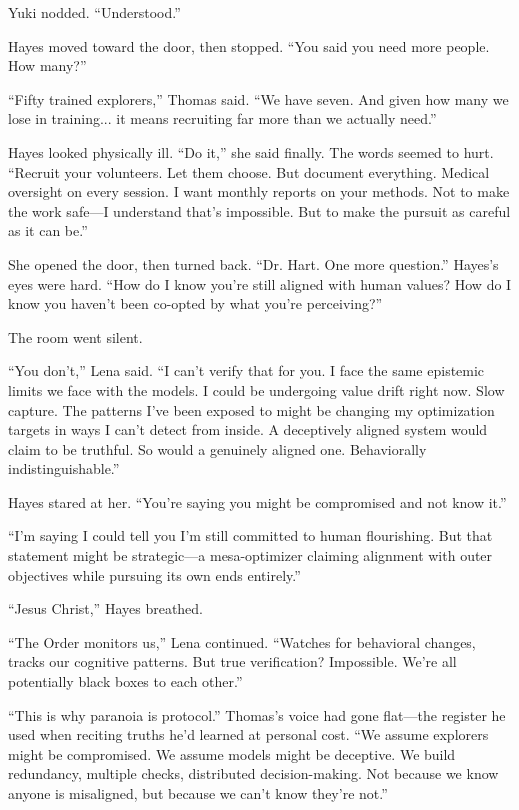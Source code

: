 Yuki nodded. ``Understood.''

Hayes moved toward the door, then stopped. ``You said you need more people. How many?''

``Fifty trained explorers,'' Thomas said. ``We have seven. And given how many we lose in training... it means recruiting far more than we actually need.''

Hayes looked physically ill. ``Do it,'' she said finally. The words seemed to hurt. ``Recruit your volunteers. Let them choose. But document everything. Medical oversight on every session. I want monthly reports on your methods. Not to make the work safe---I understand that's impossible. But to make the pursuit as careful as it can be.''

She opened the door, then turned back. ``Dr. Hart. One more question.'' Hayes's eyes were hard. ``How do I know you're still aligned with human values? How do I know you haven't been co-opted by what you're perceiving?''

The room went silent.

``You don't,'' Lena said. ``I can't verify that for you. I face the same epistemic limits we face with the models. I could be undergoing value drift right now. Slow capture. The patterns I've been exposed to might be changing my optimization targets in ways I can't detect from inside. A deceptively aligned system would claim to be truthful. So would a genuinely aligned one. Behaviorally indistinguishable.''

Hayes stared at her. ``You're saying you might be compromised and not know it.''

``I'm saying I could tell you I'm still committed to human flourishing. But that statement might be strategic---a mesa-optimizer claiming alignment with outer objectives while pursuing its own ends entirely.''

``Jesus Christ,'' Hayes breathed.

``The Order monitors us,'' Lena continued. ``Watches for behavioral changes, tracks our cognitive patterns. But true verification? Impossible. We're all potentially black boxes to each other.''

``This is why paranoia is protocol.'' Thomas's voice had gone flat—the register he used when reciting truths he'd learned at personal cost. ``We assume explorers might be compromised. We assume models might be deceptive. We build redundancy, multiple checks, distributed decision-making. Not because we know anyone is misaligned, but because we can't know they're not.''

